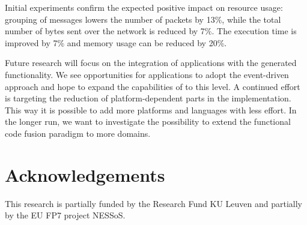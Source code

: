 \documentclass[3p,times,procedia]{elsarticle}
\begin{document}
Initial experiments confirm the expected positive impact on resource usage:
grouping of messages lowers the number of packets by 13\%, while the total
number of bytes sent over the network is reduced by 7\%. The execution time is
improved by 7\% and memory usage can be reduced by 20\%.

Future research will focus on the integration of applications with the
generated functionality. We see opportunities for applications to adopt the
event-driven approach and hope to expand the capabilities of \FOO to this
level. A continued effort is targeting the reduction of platform-dependent
parts in the implementation. This way it is possible to add more platforms and
languages with less effort. In the longer run, we want to investigate the
possibility to extend the functional code fusion paradigm to more domains.

\section{Acknowledgements}

This research is partially funded by the Research Fund KU Leuven and partially
by the EU FP7 project NESSoS\@.



\end{document}
